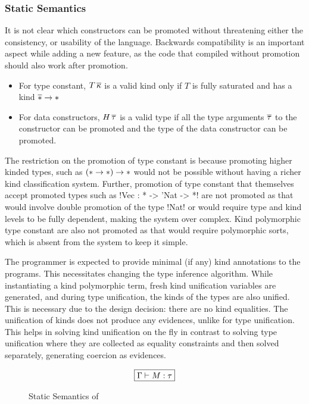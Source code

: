 \documentclass[manuscript,screen,nonacm]{acmart}
\begin{document}
\subsubsection{Static Semantics}
It is not clear which constructors can be promoted without threatening either the consistency, or usability of the language. Backwards compatibility is an important aspect while adding a new feature, as the code that compiled without promotion should also work after promotion.

\begin{itemize}
\item For type constant, $T\,\overline{\kappa}$ is a valid kind only if $T$ is fully saturated and has a kind $\overline{\ast} \to \ast$
\item For data constructors, $H\,\overline{\tau}$ is a valid type if all the type arguments $\overline{\tau}$ to the constructor can be promoted and the type of the data constructor can be promoted.
\end{itemize}

The restriction on the promotion of type constant is because promoting higher kinded types, such as $(\ast \to \ast) \to \ast$ would not be possible without having a richer kind classification system. Further, promotion of type constant that themselves accept promoted types such as !Vec : * -> 'Nat -> *! are not promoted as that would involve double promotion of the type !Nat! or would require type and kind levels to be fully dependent, making the system over complex. Kind polymorphic type constant are also not promoted as that would require polymorphic sorts, which is absent from the system to keep it simple.

The programmer is expected to provide minimal (if any) kind annotations to the programs. This necessitates changing the type inference algorithm. While instantiating a kind polymorphic term, fresh kind unification variables are generated, and during type unification, the kinds of the types are also unified. This is necessary due to the design decision: there are no kind equalities. The unification of kinds does not produce any evidences, unlike for type unification. This helps in solving kind unification on the fly in contrast to solving type unification where they are collected as equality constraints and then solved separately, generating coercion as evidences.

\begin{figure}[ht]
 \centering
 \begin{gather*}
 \fbox{$\Gamma \vdash M : \tau$}
 \end{gather*}
 \caption{Static Semantics of \SFP}
 \label{fig:sfp-typing}
\end{figure}
\end{document}
